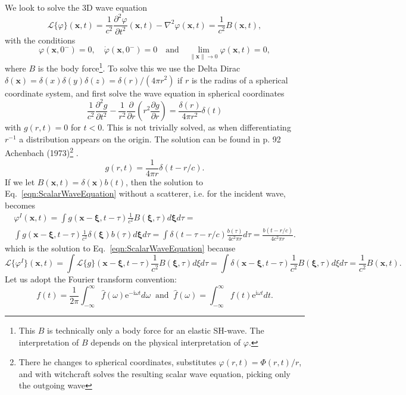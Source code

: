\documentclass[ 12pt, a4paper]{article}
\newcommand{\be}{\begin{equation}}
\newcommand{\en}{\end{equation}}
\newcommand{\ii}{\textrm{i}}
\newcommand{\ee}{\textrm{e}}
\renewcommand{\vec}[1]{\boldsymbol{#1}}
\begin{document}
We look to solve the 3D wave equation
\be
\mathcal L \{\varphi \}(\vec x,t) = \frac{1}{c^2} \frac{\partial^2 \varphi}{\partial t^2}(\vec x,t) - \nabla^2 \varphi(\vec x,t)  = \frac{1}{c^2}B(\vec x,t),
\label{eqn:ScalarWaveEquation}
\en
with the conditions
\be
\varphi(\vec x,0^{-}) =0 , \quad \dot \varphi( \vec x,0^{-}) =0 \quad \text{and} \quad  \lim_{\|\vec x\| \to 0} \varphi(\vec x,t) =0,
\en
where $B$ is the body force\footnote{This $B$ is technically only a body force for an elastic SH-wave. The interpretation of $B$ depends on the physical interpretation of $\varphi$.}. To solve this we use the Delta Dirac $\delta(\vec x) = \delta(x)\delta(y)\delta(z) = \delta (r)/(4 \pi r^2)$ if $r$ is the radius of a spherical coordinate system, and first solve the wave equation in spherical coordinates
\be
\frac{1}{c^2}\frac{\partial^2 g}{\partial t^2} -  \frac{1}{r^2} \frac{\partial}{\partial r} \left (r^2 \frac{\partial g}{\partial r} \right )  = \frac{\delta(r)}{4 \pi r^2} \delta (t)
\en
with $g(r,t) =0$ for $t<0$.  This is not trivially solved, as when differentiating $r^{-1}$ a distribution appears on the origin. The solution can be found in p. 92 Achenbach (1973)\footnote{There he changes to spherical coordinates, substitutes $\varphi(r,t) = \Phi(r,t)/r$, and with witchcraft solves the resulting scalar wave equation, picking only the outgoing wave} .
\be
g(r, t) = \frac{1}{4 \pi r} \delta(t - r/c).
\label{eqn:ScalarGreen3D}
\en
 If we let $B(\vec x,t) = \delta (\vec x) b(t)$, then the solution to Eq.~\eqref{eqn:ScalarWaveEquation} without a scatterer, i.e. for the incident wave, becomes
\begin{multline}
\varphi^I(\vec x,t) = \int g(\vec x - \vec \xi,t -\tau)\frac{1}{c^2} B(\vec \xi, \tau) d \vec \xi d\tau =
\\
 \int g(\vec x - \vec \xi,t -\tau)\frac{1}{c^2} \delta(\vec \xi) b(\tau) d \vec \xi d\tau =  \int \delta(t- \tau - r/c) \frac{b(\tau)}{4 c^2 \pi r}  d\tau = \frac{b(t- r/c)}{4 c^2 \pi r}.
\label{eqn:ScalarPointImpact}
\end{multline}
which is the solution to Eq.~\eqref{eqn:ScalarWaveEquation} because
\[
\mathcal L \{\varphi^I \}(\vec x,t) = \int \mathcal L \{ g \}(\vec x -\vec \xi,t -\tau)\frac{1}{c^2}B(\vec \xi, \tau) d \xi d \tau =  \int  \delta(\vec x -\vec \xi,t -\tau) \frac{1}{c^2} B(\vec \xi, \tau) d \xi d \tau = \frac{1}{c^2}B(\vec x,t).
\]
Let us adopt the Fourier transform convention:
\[
f(t) = \frac{1}{2 \pi} \int_{-\infty}^\infty \hat f(\omega) \ee^{- \ii \omega t} d \omega \;\; \text{and} \;\; \hat f(\omega) = \int_{-\infty}^\infty  f(t) \ee^{\ii \omega t} d t.
\]
\end{document}
